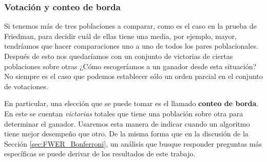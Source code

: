 


\subsubsection{Votación y conteo de borda} \label{sec:Votacion}

Si tenemos más de tres poblaciones a comparar, como es el caso en la prueba de Friedman, para decidir cuál de ellas tiene una media, por ejemplo, mayor, tendríamos que hacer comparaciones uno a uno de todos los pares poblacionales. Después de esto nos quedaríamos con un conjunto de victorias de ciertas poblaciones sobre otras ¿Cómo escogeríamos a un ganador desde esta situación? No siempre es el caso que podemos establecer sólo un orden parcial en el conjunto de votaciones. 

En particular, una elección que se puede tomar es el llamado \textbf{conteo de borda}. En este se cuentan \emph{victorias} totales que tiene una población sobre otra para determinar el ganador. Usaremos esta manera de indicar cuando un algoritmo tiene mejor desempeño que otro. De la misma forma que en la discusión de la Sección \ref{sec:FWER_Bonferroni}, un análisis que busque responder preguntas más específicas se puede derivar de los resultados de este trabajo. 









